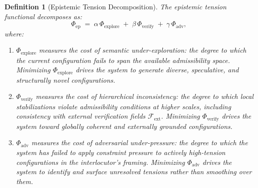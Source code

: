 \documentclass[11pt, a4paper]{article}
\theoremstyle{srn}
\newtheorem{definition}{Definition}[section]
\theoremstyle{srnremark}
\newcommand{\Phiten}{\varPhi}            %
\begin{document}
\begin{definition}[Epistemic Tension Decomposition]
\label{def:epistemic}
The \emph{epistemic tension functional} decomposes as:
\[
  \Phiten_{\mathrm{ep}}
  \;=\;
  \alpha\,\Phiten_{\mathrm{explore}}
  \;+\;
  \beta\,\Phiten_{\mathrm{verify}}
  \;+\;
  \gamma\,\Phiten_{\mathrm{adv}},
\]
where:
\begin{enumerate}
  \item[(E1)] $\Phiten_{\mathrm{explore}}$ measures the cost of
    \emph{semantic under-exploration}: the degree to which the current
    configuration fails to span the available admissibility space.
    Minimizing $\Phiten_{\mathrm{explore}}$ drives the system to
    generate diverse, speculative, and structurally novel
    configurations.
  \item[(E2)] $\Phiten_{\mathrm{verify}}$ measures the cost of
    \emph{hierarchical inconsistency}: the degree to which local
    stabilizations violate admissibility conditions at higher scales,
    including consistency with external verification fields
    $\mathcal{F}_{\mathrm{ext}}$.
    Minimizing $\Phiten_{\mathrm{verify}}$ drives the system toward
    globally coherent and externally grounded configurations.
  \item[(E3)] $\Phiten_{\mathrm{adv}}$ measures the cost of
    \emph{adversarial under-pressure}: the degree to which the system
    has failed to apply constraint pressure to actively high-tension
    configurations in the interlocutor's framing.
    Minimizing $\Phiten_{\mathrm{adv}}$ drives the system to
    identify and surface unresolved tensions rather than smoothing
    over them.
\end{enumerate}
\end{definition}
\end{document}

